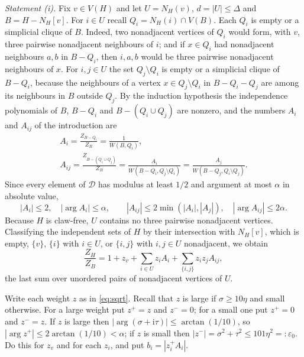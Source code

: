 \documentclass[11pt]{article}
\theoremstyle{remark}
\newcommand{\D}{\mathcal D}
\begin{document}
\medskip\noindent\emph{Statement (i).}
Fix $v\in V(H)$ and let $U=N_H(v)$, $d=|U|\le\Delta$ and $B=H-N_H[v]$. For $i\in U$ recall $Q_i=N_H(i)\cap V(B)$. Each
$Q_i$ is empty or a simplicial clique of $B$. Indeed, two nonadjacent vertices of $Q_i$ would form, with $v$, three pairwise
nonadjacent neighbours of $i$; and if $x\in Q_i$ had nonadjacent neighbours $a,b$ in $B-Q_i$, then $i,a,b$ would be
three pairwise nonadjacent neighbours of $x$. For $i,j\in U$ the set $Q_j\setminus Q_i$ is empty or a simplicial clique of
$B-Q_i$, because the neighbours of a vertex $x\in Q_j\setminus Q_i$ in $B-Q_i-Q_j$ are among its neighbours in $B$
outside $Q_j$. By the induction hypothesis the independence polynomials of $B$, $B-Q_i$ and $B-(Q_i\cup Q_j)$ are
nonzero, and the numbers $A_i$ and $A_{ij}$ of the introduction are
\begin{equation}\label{eq:A}
\begin{gathered}
A_i=\frac{Z_{B-Q_i}}{Z_B}=\frac1{W(B,Q_i)},\\
A_{ij}=\frac{Z_{B-(Q_i\cup Q_j)}}{Z_B}=\frac{A_i}{W(B-Q_i,Q_j\setminus Q_i)}=\frac{A_j}{W(B-Q_j,Q_i\setminus Q_j)}.
\end{gathered}
\end{equation}
Since every element of $\D$ has modulus at least $1/2$ and argument at most $\alpha$ in absolute value,
\begin{equation}\label{eq:Abounds}
|A_i|\le2,\quad|\arg A_i|\le\alpha,\qquad|A_{ij}|\le2\min(|A_i|,|A_j|),\quad|\arg A_{ij}|\le2\alpha .
\end{equation}
Because $H$ is claw-free, $U$ contains no three pairwise nonadjacent vertices. Classifying the independent sets of
$H$ by their intersection with $N_H[v]$, which is empty, $\{v\}$, $\{i\}$ with $i\in U$, or $\{i,j\}$ with
$i,j\in U$ nonadjacent, we obtain
\begin{equation}\label{eq:root}
\frac{Z_H}{Z_B}=1+z_v+\sum_{i\in U}z_iA_i+\sum_{\{i,j\}}z_iz_jA_{ij},
\end{equation}
the last sum over unordered pairs of nonadjacent vertices of $U$.

Write each weight $z$ as in \eqref{eq:sqrt}. Recall that $z$ is large if $\sigma\ge10\eta$ and small
otherwise. For a large weight put $z^+=z$ and $z^-=0$; for a small one put $z^+=0$ and $z^-=z$. If $z$ is large then
$|\arg(\sigma+\mathrm i\tau)|\le\arctan(1/10)$, so $|\arg z^+|\le2\arctan(1/10)<\alpha$; if $z$ is small then
$|z^-|=\sigma^2+\tau^2\le101\eta^2=:\varepsilon_0$. Do this for $z_v$ and for each $z_i$, and put $b_i=|z_i^+A_i|$.
\end{document}
